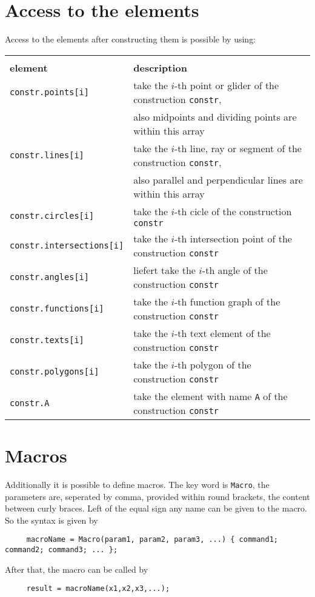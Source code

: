 \documentclass[10pt]{article}
\begin{document}
\section{Access to the elements}
Access to the elements after constructing them is possible by using: \\
\begin{tabular}
{|l|l|} \hline \\[-0.75em] {\large
\textbf{element}} & {\large \textbf{description}} \\ \hline\hline
\verb+constr.points[i]+ & take the $i$-th point or glider of the
construction \verb+constr+, \\ & also midpoints and dividing points are within this array \\
\hline\verb+constr.lines[i]+ & take the $i$-th line, ray or
segment of the construction \verb+constr+, \\ & also parallel and
perpendicular lines are within this array
\\
\hline\verb+constr.circles[i]+ & take the $i$-th cicle of the
construction \verb+constr+
\\
\hline\verb+constr.intersections[i]+ & take the $i$-th
intersection point of the construction \verb+constr+
\\
\hline\verb+constr.angles[i]+ & liefert take the $i$-th angle of
the construction \verb+constr+
\\
\hline\verb+constr.functions[i]+ & take the $i$-th function graph
of the construction \verb+constr+
\\
\hline\verb+constr.texts[i]+ & take the $i$-th text element of the
construction \verb+constr+
\\
\hline\verb+constr.polygons[i]+ & take the $i$-th polygon of the
construction \verb+constr+
\\
\hline\verb+constr.A+ & take the element with name \verb'A' of the
construction \verb+constr+
\\ \hline
\end{tabular}

\section{Macros}
Additionally it is possible to define macros. The key word is
\verb+Macro+, the parameters are, seperated by comma, provided
within round brackets, the content between curly braces. Left of
the equal sign any name can be given to the macro. \\ So the
syntax is given by
\begin{verbatim}
     macroName = Macro(param1, param2, param3, ...) { command1; command2; command3; ... };
\end{verbatim}
After that, the macro can be called by
\begin{verbatim}
     result = macroName(x1,x2,x3,...);
\end{verbatim}
\end{document}
